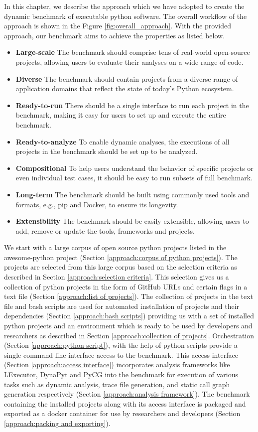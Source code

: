 In this chapter, we describe the approach which we have adopted to create the dynamic benchmark of executable python software. The overall workflow of the approach is shown in the Figure \ref{fig:overall_approach}.
With the provided approach, our benchmark aims to achieve the properties as listed below.
\begin{itemize}
    \item \textbf{Large-scale} The benchmark should comprise tens of real-world open-source projects, allowing users to evaluate their analyses on a wide range of code.
    \item \textbf{Diverse} The benchmark should contain projects from a diverse range of application domains that reflect the state of today's Python ecosystem.
    \item \textbf{Ready-to-run} There should be a single interface to run each project in the benchmark, making it easy for users to set up and execute the entire benchmark.
    \item \textbf{Ready-to-analyze} To enable dynamic analyses, the executions of all projects in the benchmark should be set up to be analyzed.
    \item \textbf{Compositional} To help users understand the behavior of specific projects or even individual test cases, it should be easy to run subsets of full benchmark.
    \item \textbf{Long-term} The benchmark should be built using commonly used tools and formats, e.g., pip and Docker, to ensure its longevity.
    \item \textbf{Extensibility} The benchmark should be easily extensible, allowing users to add, remove or update the tools, frameworks and projects.  
\end{itemize}

We start with a large corpus of open source python projects listed in the awesome-python project (Section \ref{approach:corpus of python projects}). The projects are selected from this large corpus based on the selection criteria as described in Section \ref{approach:selection criteria}. This selection gives us a collection of python projects in the form of GitHub URLs and certain flags in a text file (Section \ref{approach:list of projects}). The collection of projects in the text file and bash scripts are used for automated installation of projects and their dependencies (Section \ref{approach:bash scripts}) providing us with a set of installed python projects and an environment which is ready to be used by developers and researchers as described in Section \ref{approach:collection of projects}. Orchestration (Section \ref{approach:python script}), with the help of python scripts provide a single command line interface access to the benchmark.  This access interface (Section \ref{approach:access interface}) incorporates  analysis frameworks like LExecutor, DynaPyt and PyCG into the benchmark for execution of various tasks such as dynamic analysis, trace file generation, and static call graph generation respectively (Section \ref{approach:analysis framework}). The benchmark containing the installed projects along with its access interface is packaged and exported as a docker container for use by researchers and developers (Section \ref{approach:packing and exporting}).

